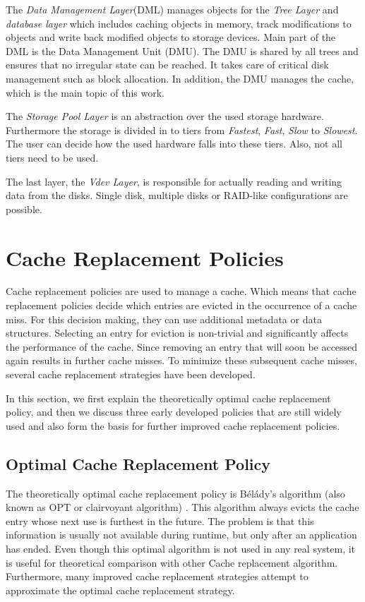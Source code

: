 \documentclass[
	12pt,
	a4paper,
	abstract,
	bibliography=totoc,
	chapterprefix,
	headings=openright,
	numbers=endperiod,
	parskip=half,
	twoside,
]{scrreprt}
\begin{document}
The \emph{Data Management Layer}(DML) manages objects for the \emph{Tree Layer} and \emph{database layer} 
which includes caching objects in memory, track modifications to objects and write back modified objects to storage devices.
Main part of the DML is the Data Management Unit (DMU).
The DMU is shared by all trees and ensures that no irregular state can be reached.
It takes care of critical disk management such as block allocation.
In addition, the DMU manages the cache, which is the main topic of this work.

The \emph{Storage Pool Layer} is an abstraction over the used storage hardware.
Furthermore the storage is divided in to tiers from \emph{Fastest}, \emph{Fast}, \emph{Slow} to \emph{Slowest}.
The user can decide how the used hardware falls into these tiers. Also, not all tiers need to be used.

The last layer, the \emph{Vdev Layer}, is responsible for actually reading and writing data from the disks.
Single disk, multiple disks or RAID-like configurations are possible.

\section{Cache Replacement Policies}
\label{sec:cache replacement policies}

Cache replacement policies are used to manage a cache. 
Which means that cache replacement policies decide which entries are evicted in the occurrence of a cache miss.
For this decision making, they can use additional metadata or data structures.
Selecting an entry for eviction is non-trivial and significantly affects the performance of the cache.
Since removing an entry that will soon be accessed again results in further cache misses.
To minimize these subsequent cache misses, several cache replacement strategies have been developed.

In this section, we first explain the theoretically optimal cache replacement policy, 
and then we discuss three early developed policies that are still widely used and 
also form the basis for further improved cache replacement policies.

\subsection{Optimal Cache Replacement Policy}
The theoretically optimal cache replacement policy is Bélády's algorithm (also known as OPT or clairvoyant algorithm) \cite{belady1966study}.
This algorithm always evicts the cache entry whose next use is furthest in the future.
The problem is that this information is usually not available during runtime, but only after an application has ended.
Even though this optimal algorithm is not used in any real system, it is useful for theoretical comparison with other 
Cache replacement algorithm.
Furthermore, many improved cache replacement strategies attempt to approximate the optimal cache replacement strategy.
\end{document}
